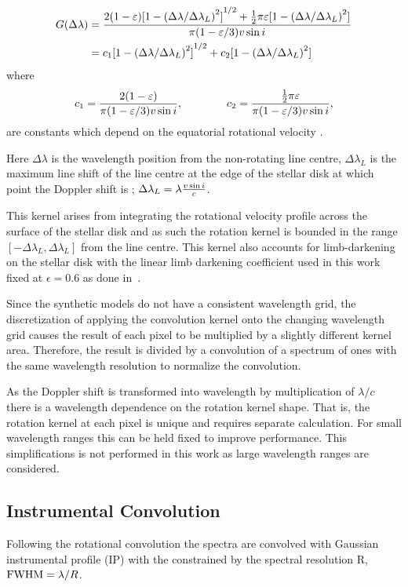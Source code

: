 \begin{align}
G(\Delta\lambda) &= \frac{2(1-\varepsilon){[1-{(\Delta\lambda /{\Delta\lambda}_{L})}^{2}]}^{1/2} +   \frac{1}{2}\pi\varepsilon[1-{(\Delta\lambda /{\Delta\lambda}_{L})}^{2}]}{\pi (1-\varepsilon/3) v\sin{i}}\\
      &= c_{1}{[1- {(\Delta\lambda /\Delta\lambda_{L})}^{2}]}^{1/2} + c_{2}[1-{(\Delta\lambda /\Delta\lambda_{L})}^{2}] \label{eqn:rotational_profile}
\end{align}
where
\begin{equation}
c_1 = \frac{2(1-\varepsilon)} {\pi (1-\varepsilon/3)v\sin{i}},  \hspace{4em} c_2 = \frac{\frac{1}{2}\pi\varepsilon} {\pi (1-\varepsilon/3)v\sin{i}},
\end{equation}
are constants which depend on the equatorial rotational velocity \Vsini{}.

Here $\Delta\lambda$ is the wavelength position from the non-rotating line centre, $\Delta\lambda_{L}$ is the maximum line shift of the line centre at the edge of the stellar disk at which point the Doppler shift is  \Vsini{}; $\Delta\lambda_{L} = \lambda \frac{v\sin{i}}{c}$.

This kernel arises from integrating the rotational velocity profile across the surface of the stellar disk and as such the rotation kernel is bounded in the range  $[-\Delta\lambda_L, \Delta\lambda_{L}]$ from the line centre.
This kernel also accounts for limb-darkening on the stellar disk with the linear limb darkening coefficient used in this work fixed at $\epsilon=0.6$ as done in~\citet{figueira_radial_2016}.

Since the synthetic models do not have a consistent wavelength grid, the discretization of applying the convolution kernel onto the changing wavelength grid causes the result of each pixel to be multiplied by a slightly different kernel area.
Therefore, the result is divided by a convolution of a spectrum of ones with the same wavelength resolution to normalize the convolution.

As the Doppler shift \Vsini{} is transformed into wavelength by multiplication of $\lambda  / c$ there is a wavelength dependence on the rotation kernel shape.
That is, the rotation kernel at each pixel is unique and requires separate calculation.
For small wavelength ranges this can be held fixed to improve performance.
This simplifications is not performed in this work as large wavelength ranges are considered.


\subsection{Instrumental Convolution}
Following the rotational convolution the spectra are convolved with Gaussian instrumental profile ({\textrm{IP}}) with the {\fwhm}  constrained by the spectral resolution R, $\textrm{FWHM}= \lambda/R$.

